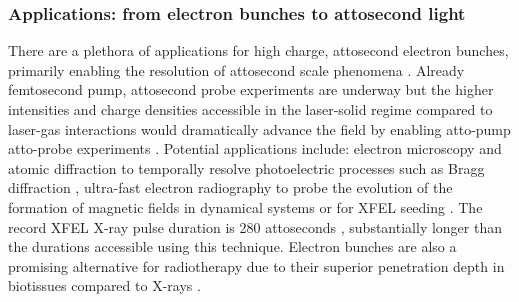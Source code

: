\subsubsection{Applications: from electron bunches to attosecond light}
There are a plethora of applications for high charge, attosecond electron bunches, primarily enabling the resolution of attosecond scale phenomena \cite{krauszAttosecondPhysics2009}. Already femtosecond pump, attosecond probe experiments are underway \cite{calegariUltrafastElectronDynamics,takahashiNonlinearAttosecondMetrology2015} but the higher intensities and charge densities accessible in the laser-solid regime compared to laser-gas interactions \cite{edwardsXRayEmissionEffectiveness2020, linIsolatedAttosecondElectron2020} would dramatically advance the field by enabling atto-pump atto-probe experiments \cite{zhangGiantIsolatedAttosecond2020}. Potential applications include: electron microscopy and atomic diffraction to temporally resolve photoelectric processes such as Bragg diffraction \cite{morimotoDiffractionMicroscopyAttosecond2018}, ultra-fast electron radiography to probe the evolution of the formation of magnetic fields in dynamical systems \cite{schumakerUltrafastElectronRadiography2013} or for XFEL seeding \cite{cardenasSubcycleDynamicsRelativistic2019}. The record XFEL X-ray pulse duration is 280 attoseconds \cite{durisTunableIsolatedAttosecond2020}, substantially longer than the durations accessible using this technique. Electron bunches are also a promising alternative for radiotherapy due to their superior penetration depth in biotissues compared to X-rays \cite{glinecRadiotherapyLaserPlasma2006}.

